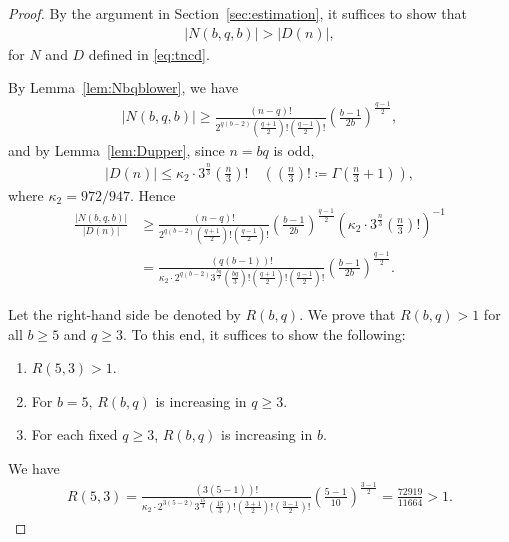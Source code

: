 \documentclass[12pt,reqno]{amsart}
\newcommand{\HL}{\vspace{2mm}}							%
\newcommand{\q}{\quad}									%
\newcommand{\f}[2]{\frac{#1}{#2}}							%
\newcommand{\ceq}{\coloneqq} 							%
\newcommand{\vt}[1]{\left\lvert #1 \right\rvert}					%
\theoremstyle{mythmstyle}
\theoremstyle{mydefstyle}
\newcommand{\lemref}[1]{Lemma~\ref{#1}}
\numberwithin{equation}{section}
\begin{document}
\begin{proof}
By the argument in Section~\ref{sec:estimation}, it suffices to show that
\begin{align}
\vt{N(b, q, b)} > \vt{D(n)},
\end{align}
for $N$ and $D$ defined in \eqref{eq:tncd}.

By \lemref{lem:Nbqblower}, we have
\begin{align}
\vt{N(b, q, b)} \ge \f{(n-q)!}{2^{q(b-2)}\left(\f{q+1}{2}\right)!\left(\f{q-1}{2}\right)!}\left(\f{b-1}{2b}\right)^{\f{q-1}{2}},
\end{align}
and by \lemref{lem:Dupper}, since $n = bq$ is odd,
\begin{align}
\vt{D(n)} \le \kappa_{2}\cdot 3^{\f{n}{3}}\left(\f{n}{3}\right)!\q \left(\left(\f{n}{3}\right)! \ceq \Gamma\left(\f{n}{3}+1\right)\right),
\end{align}
where $\kappa_{2} = 972/947$.
Hence
\begin{align}
\f{\vt{N(b,q,b)}}{\vt{D(n)}} &\ge \f{(n-q)!}{2^{q(b-2)}\left(\f{q+1}{2}\right)!\left(\f{q-1}{2}\right)!}\left(\f{b-1}{2b}\right)^{\f{q-1}{2}}
\left(\kappa_{2}\cdot 3^{\f{n}{3}}\left(\f{n}{3}\right)!\right)^{-1} \\
&= \f{(q(b-1))!}{\kappa_{2}\cdot 2^{q(b-2)}3^{\f{bq}{3}}\left(\f{bq}{3}\right)!\left(\f{q+1}{2}\right)!\left(\f{q-1}{2}\right)!}\left(\f{b-1}{2b}\right)^{\f{q-1}{2}}.
\end{align}

Let the right-hand side be denoted by $R(b,q)$.
We prove that $R(b,q) > 1$ for all $b \ge 5$ and $q \ge 3$.
To this end, it suffices to show the following:
\begin{enumerate}
\item\label{itm:R53} $R(5,3) > 1$.
\item\label{itm:R5q} For $b=5$, $R(b,q)$ is increasing in $q \ge 3$.
\item\label{itm:Rbq} For each fixed $q \ge 3$, $R(b,q)$ is increasing in $b$.
\end{enumerate}
\HL

\item[\ref{itm:R53}] We have
\begin{align}
R(5, 3) = \f{(3(5-1))!}{\kappa_{2}\cdot 2^{3(5-2)}3^{\f{15}{3}}\left(\f{15}{3}\right)!\left(\f{3+1}{2}\right)!\left(\f{3-1}{2}\right)!}\left(\f{5-1}{10}\right)^{\f{3-1}{2}} = \f{72919}{11664} > 1.
\end{align}
\HL


\end{proof}
\end{document}
